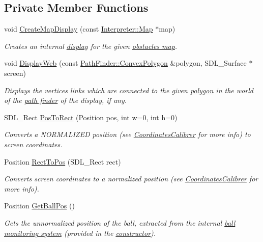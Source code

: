 \subsection*{Private Member Functions}
\begin{DoxyCompactItemize}
\item 
void \hyperlink{classRefereeDisplay_a9c18f26c62f9507f903ec9b29c1bfea8}{CreateMapDisplay} (const \hyperlink{classMatrix}{Interpreter::Map} $\ast$map)
\begin{DoxyCompactList}\small\item\em Creates an internal \hyperlink{classMapDisplay}{display} for the given \hyperlink{classInterpreter_a4c080f069f557cf92dfe803117a6ea53}{obstacles map}. \item\end{DoxyCompactList}\item 
void \hyperlink{classRefereeDisplay_ae40cc8040d1fe441a8f38fe2fc0b8974}{DisplayWeb} (const \hyperlink{structPathFinder_1_1ConvexPolygon}{PathFinder::ConvexPolygon} \&polygon, SDL\_\-Surface $\ast$screen)
\begin{DoxyCompactList}\small\item\em Displays the vertices links which are connected to the given \hyperlink{structPathFinder_1_1ConvexPolygon}{polygon} in the world of the \hyperlink{classPathFinder}{path finder} of the display, if any. \item\end{DoxyCompactList}\item 
SDL\_\-Rect \hyperlink{classRefereeDisplay_a56d7e17a5fb16cbe64fb7ef3e4f28af0}{PosToRect} (Position pos, int w=0, int h=0)
\begin{DoxyCompactList}\small\item\em Converts a NORMALIZED position (see \hyperlink{classCoordinatesCalibrer}{CoordinatesCalibrer} for more info) to screen coordinates. \item\end{DoxyCompactList}\item 
Position \hyperlink{classRefereeDisplay_a4abb9b85d92cbdd30fe6fd29a17c3767}{RectToPos} (SDL\_\-Rect rect)
\begin{DoxyCompactList}\small\item\em Converts screen coordinates to a normalized position (see \hyperlink{classCoordinatesCalibrer}{CoordinatesCalibrer} for more info). \item\end{DoxyCompactList}\item 
Position \hyperlink{classRefereeDisplay_afa7601bcd5b6361398f48f2fb1d6ead4}{GetBallPos} ()
\begin{DoxyCompactList}\small\item\em Gets the unnormalized position of the ball, extracted from the internal \hyperlink{classBallMonitor}{ball monitoring system} (provided in the \hyperlink{classRefereeDisplay_a8f7d4872a24b44b96a36a5bbf991f5d2}{constructor}). \item\end{DoxyCompactList}\end{DoxyCompactItemize}

